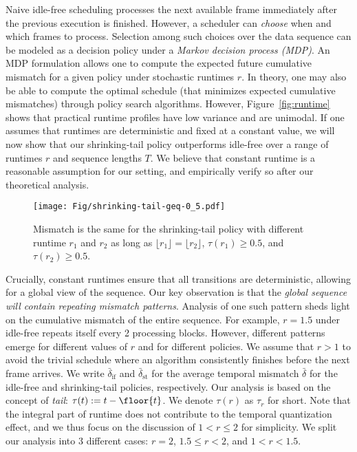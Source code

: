  Naive idle-free scheduling processes the next available frame immediately after the previous execution is finished. However, a scheduler can {\em choose} when and which frames to process. Selection among such choices over the data sequence can be modeled as a decision policy under a {\em Markov decision process (MDP)}. An MDP formulation allows one to compute the expected future cumulative mismatch for a given policy under stochastic runtimes $r$.
In theory, one may also be able to compute the optimal schedule (that minimizes expected cumulative mismatches) through policy search algorithms. 
However, Figure~\ref{fig:runtime} shows that practical runtime profiles have low variance and are unimodal. If one assumes that runtimes are deterministic and fixed at a constant value, we will now show that our shrinking-tail policy outperforms idle-free over a range of runtimes $r$ and sequence lengths $T$. We believe that constant runtime is a reasonable assumption for our setting, and empirically verify so after our theoretical analysis. 

\begin{figure}[!b]
\centering
\texttt{[image: Fig/shrinking-tail-geq-0\_5.pdf]}

\caption{Mismatch is the same for the shrinking-tail policy with different runtime $r_1$ and $r_2$ as long as $\lfloor r_1 \rfloor = \lfloor r_2 \rfloor$, $\tau(r_1) \geq 0.5$, and $\tau(r_2) \geq 0.5$.
}
\label{fig:shrinking-tail-geq-0.5}
\end{figure}

 Crucially, constant runtimes ensure that all transitions are deterministic, allowing for a global view of the sequence. Our key observation is that the {\em global sequence will contain repeating mismatch patterns}. Analysis of one such pattern sheds light on the cumulative mismatch of the entire sequence. For example, $r=1.5$ under idle-free repeats itself every 2 processing blocks. However, different patterns emerge for different values of $r$ and for different policies.
We assume that $r > 1$ to avoid the trivial schedule where an algorithm consistently finishes before the next frame arrives. We write $\bar{\delta}_{\text{if}}$ and $\bar{\delta}_{\text{st}}$ for the average temporal mismatch $\bar{\delta}$ for the idle-free and shrinking-tail policies, respectively. Our analysis is based on the concept of {\em tail}:
$\tau(t) := t - \floor{t}$. We denote $\tau(r)$ as $\tau_r$ for short. Note that the integral part of runtime does not contribute to the temporal quantization effect, and we thus focus on the discussion of $1 < r \leq 2$ for simplicity.
We split our analysis into 3 different cases:
$r=2$, $1.5 \leq r < 2$, and $1 < r < 1.5$.

